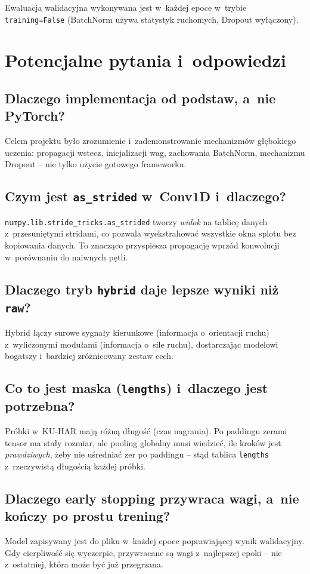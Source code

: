 \documentclass[12pt,a4paper]{article}
\begin{document}
Ewaluacja walidacyjna wykonywana jest w~każdej epoce w~trybie \texttt{training=False} (BatchNorm używa statystyk ruchomych, Dropout wyłączony).

\section{Potencjalne pytania i~odpowiedzi}

\subsection*{Dlaczego implementacja od podstaw, a~nie PyTorch?}
Celem projektu było zrozumienie i~zademonstrowanie mechanizmów głębokiego uczenia: propagacji wstecz, inicjalizacji wag, zachowania BatchNorm, mechanizmu Dropout -- nie tylko użycie gotowego frameworku.

\subsection*{Czym jest \texttt{as\_strided} w~Conv1D i~dlaczego?}
\texttt{numpy.lib.stride\_tricks.as\_strided} tworzy \textit{widok} na tablicę danych z~przesuniętymi stridami, co pozwala wyekstrahować wszystkie okna splotu bez kopiowania danych. To znacząco przyspiesza propagację wprzód konwolucji w~porównaniu do naiwnych pętli.

\subsection*{Dlaczego tryb \texttt{hybrid} daje lepsze wyniki niż \texttt{raw}?}
Hybrid łączy surowe sygnały kierunkowe (informacja o~orientacji ruchu) z~wyliczonymi modułami (informacja o~sile ruchu), dostarczając modelowi bogatszy i~bardziej zróżnicowany zestaw cech.

\subsection*{Co to jest maska (\texttt{lengths}) i~dlaczego jest potrzebna?}
Próbki w~KU-HAR mają różną długość (czas nagrania). Po paddingu zerami tensor ma stały rozmiar, ale pooling globalny musi wiedzieć, ile kroków jest \textit{prawdziwych}, żeby nie uśredniać zer po paddingu -- stąd tablica \texttt{lengths} z~rzeczywistą długością każdej próbki.

\subsection*{Dlaczego early stopping przywraca wagi, a~nie kończy po prostu trening?}
Model zapisywany jest do pliku w~każdej epoce poprawiającej wynik walidacyjny. Gdy cierpliwość się wyczerpie, przywracane są wagi z~najlepszej epoki -- nie z~ostatniej, która może być już przegrzana.
\end{document}

